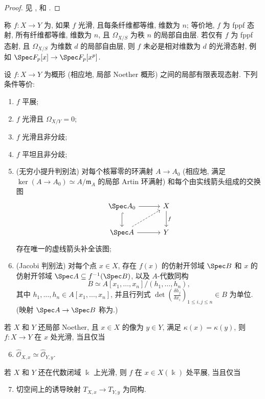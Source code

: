 \begin{proof}
见 \cite[习题 II.$8.6$, 命题 III.$10.4$]{Har77}, \cite[$0.22.6.1$, IV$_4$.$17.5,14$]{EGA} 和 \cite[Tags 01V9, 02H6, 02HX]{SP}.
\end{proof}
称 $f:X\to Y$ 为, 如果 $f$ 光滑, 且每条纤维都等维, 维数为 $n$; 等价地, $f$ 为 fppf 态射, 所有纤维都等维, 维数为 $n$, 且 $\Omega_{X/S}$ 为秩 $n$ 的局部自由层. 若仅有 $f$ 为 fppf 态射, 且 $\Omega_{X/S}$ 为维数 $d$ 的局部自由层, 则 $f$ 未必是相对维数为 $d$ 的光滑态射, 例如 $\Spec\mathbb F_p[x]\to\Spec\mathbb F_p[x^p]$.
\begin{theorem}[平展性的等价条件]\label{src:A.3.2}
设 $f:X\to Y$ 为概形 (相应地, 局部 Noether 概形) 之间的局部有限表现态射. 下列条件等价:
\begin{enumerate}[(1)]
\item $f$ 平展;
\item $f$ 光滑且 $\Omega_{X/Y}=0$;
\item $f$ 光滑且非分歧;
\item $f$ 平坦且非分歧;
\item (无穷小提升判别法) 对每个核幂零的环满射 $A\to A_0$ (相应地, 满足 $\ker(A\to A_0)\simeq A/\mathfrak m_A$ 的局部 Artin 环满射) 和每个由实线箭头组成的交换图
\[
\begin{tikzcd}[column sep=3em,row sep=2em]
\Spec A_0\arrow[r]\arrow[d,hook]&X\arrow[d,"f"]\\
\Spec A\arrow[r]\arrow[ur,dashed]&Y
\end{tikzcd}
\]
存在唯一的虚线箭头补全该图;
\item (Jacobi 判别法) 对每个点 $x\in X$, 存在 $f(x)$ 的仿射开邻域 $\Spec B$ 和 $x$ 的仿射开邻域 $\Spec A\subseteq f^{-1}(\Spec B)$, 以及 $A$-代数同构
\[
B\simeq A[x_1,\ldots,x_n]/(h_1,\ldots,h_n),
\]
其中 $h_1,\ldots,h_n\in A[x_1,\ldots,x_n]$, 并且行列式 $\det(\frac{\delta h_j}{\delta x_i})_{1\leq i,j\leq n}\in B$ 为单位. (映射 $\Spec A\to\Spec B$ 称为.)
\end{enumerate}
若 $X$ 和 $Y$ 还局部 Noether, 且 $x\in X$ 的像为 $y\in Y$, 满足 $\kappa(x)=\kappa(y)$, 则 $f:X\to Y$ 在 $x$ 处光滑, 当且仅当
\begin{enumerate}[(1)]\setcounter{enumi}{5}
\item $\widehat{\mathcal O}_{X,x}\simeq\widehat{\mathcal O}_{Y,y}$.
\end{enumerate}
若 $X$ 和 $Y$ 还在代数闭域 $\Bbbk$ 上光滑, 则 $f$ 在 $x\in X(\Bbbk)$ 处平展, 当且仅当
\begin{enumerate}[(1)]\setcounter{enumi}{6}
\item 切空间上的诱导映射 $T_{X,x}\to T_{Y,y}$ 为同构.
\end{enumerate}
\end{theorem}
